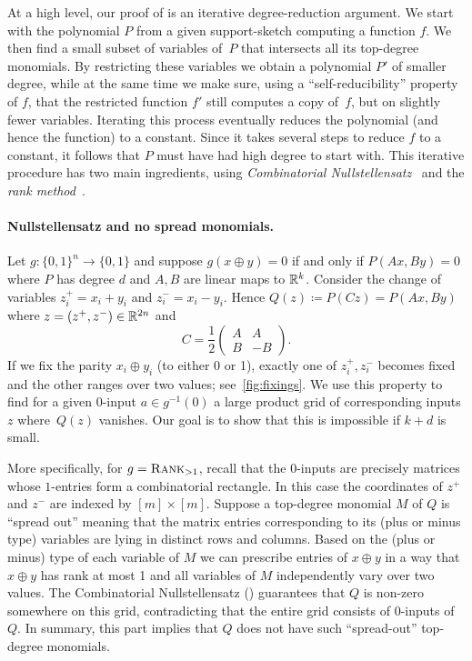 \documentclass{article}
\begin{document}
At a high level, our proof of  is an iterative degree-reduction argument.
We start with the polynomial $P$ from a given support-sketch computing a function $f$. We then find a small subset of variables of~$P$ that intersects all its top-degree monomials. By restricting these variables we obtain a polynomial $P'$ of smaller degree, while at the same time we make sure, using a ``self-reducibility'' property of $f$, that the restricted function $f'$ still computes a copy of~$f$, but on slightly fewer variables. Iterating this process eventually reduces the polynomial (and hence the function) to a constant. Since it takes several steps to reduce $f$ to a constant, it follows that $P$ must have had high degree to start with. This iterative procedure has two main ingredients, using \emph{Combinatorial Nullstellensatz}~\cite{alonCombinatorialNullstellensatz1999} and the \emph{rank method}~\cite{Nisan91}.


\paragraph{Nullstellensatz and no spread monomials.}
Let $g\colon\{0,1\}^n\to\{0,1\}$ and suppose $g(x\oplus y)=0$ if and only if $P(Ax,By)=0$ where $P$ has degree $d$ and $A,B$ are linear maps to $\mathbb{R}^k$. Consider the change of variables $z_i^+ = x_i+y_i$ and $z_i^- = x_i-y_i$. Hence $Q(z)\coloneqq P(Cz) = P(Ax,By)$ where $z = (z^+,z^-)\in \mathbb{R}^{2n}$ and
\[
C = \frac{1}{2}\begin{pmatrix}
    A & A\\
    B & -B
\end{pmatrix}.
\]
If we fix the parity $x_i\oplus y_i$ (to either 0 or 1), exactly one of $z_i^+,z_i^-$ becomes fixed and the other ranges over two values; see~\cref{fig:fixings}. We use this property to find for a given 0-input $a\in g^{-1}(0)$ a large product grid of corresponding inputs $z$ where~$Q(z)$ vanishes. Our goal is to show that this is impossible if $k+d$ is small. 

More specifically, for $g = \operatorname{\textsc{Rank}}_{>1}$, recall that the 0-inputs are precisely matrices whose $1$-entries form a combinatorial rectangle. In this case the coordinates of $z^+$ and $z^-$ are indexed by $[m]\times [m]$. Suppose a top-degree monomial $M$ of $Q$ is ``spread out'' meaning that the matrix entries corresponding to its (plus or minus type) variables are lying in distinct rows and columns. Based on the (plus or minus) type of each variable of $M$ we can prescribe entries of $x\oplus y$ in a way that $x\oplus y$ has rank at most 1 and all variables of $M$ independently vary over two values. The Combinatorial Nullstellensatz () guarantees that $Q$ is non-zero somewhere on this grid, contradicting that the entire grid consists of 0-inputs of $Q$. In summary, this part implies that $Q$ does not have such ``spread-out'' top-degree monomials.
\end{document}
